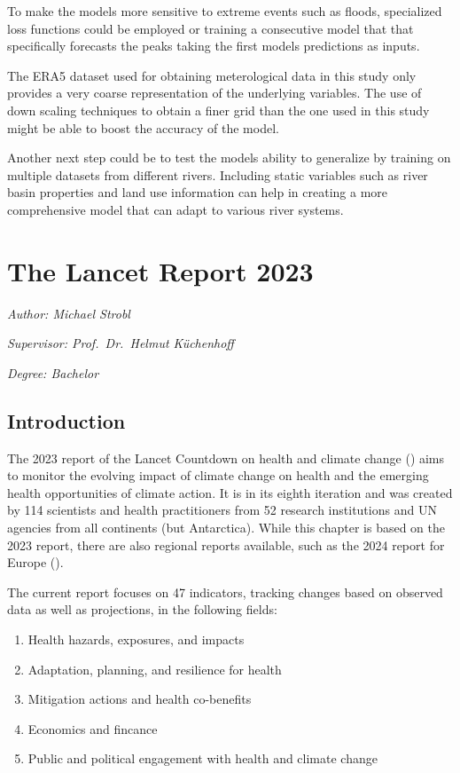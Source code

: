 \documentclass[
]{krantz}
\providecommand{\tightlist}{%
  \setlength{\itemsep}{0pt}\setlength{\parskip}{0pt}}
\begin{document}
To make the models more sensitive to extreme events such as floods, specialized loss functions could be employed or training a consecutive model that that specifically forecasts the peaks taking the first models predictions as inputs.

The ERA5 dataset used for obtaining meterological data in this study only provides a very coarse representation of the underlying variables. The use of down scaling techniques to obtain a finer grid than the one used in this study might be able to boost the accuracy of the model.

Another next step could be to test the models ability to generalize by training on multiple datasets from different rivers. Including static variables such as river basin properties and land use information can help in creating a more comprehensive model that can adapt to various river systems.

\chapter{The Lancet Report 2023}\label{he1}

\emph{Author: Michael Strobl}

\emph{Supervisor: Prof.~Dr.~Helmut Küchenhoff}

\emph{Degree: Bachelor}

\section{Introduction}\label{introduction-5}

The 2023 report of the Lancet Countdown on health and climate change (\citet{romanello2023}) aims to monitor the evolving impact of climate change on health and the emerging health opportunities of climate action. It is in its eighth iteration and was created by 114 scientists and health practitioners from 52 research institutions and UN agencies from all continents (but Antarctica). While this chapter is based on the 2023 report, there are also regional reports available, such as the 2024 report for Europe (\citet{vandaalen2024}).

The current report focuses on 47 indicators, tracking changes based on observed data as well as projections, in the following fields:

\begin{enumerate}
\tightlist
\item
  Health hazards, exposures, and impacts
\item
  Adaptation, planning, and resilience for health
\item
  Mitigation actions and health co-benefits
\item
  Economics and fincance
\item
  Public and political engagement with health and climate change
\end{enumerate}
\end{document}
